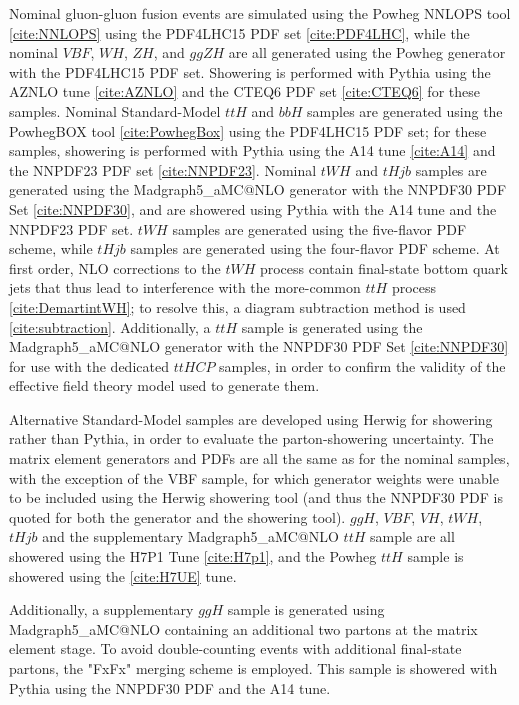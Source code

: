 Nominal gluon-gluon fusion events are simulated using the Powheg NNLOPS tool \ref{cite:NNLOPS} using the PDF4LHC15 PDF set \ref{cite:PDF4LHC}, while the nominal $VBF$, $WH$, $ZH$, and $ggZH$ are all generated using the Powheg generator with the PDF4LHC15 PDF set. Showering is performed with Pythia using the AZNLO tune \ref{cite:AZNLO} and the CTEQ6 PDF set \ref{cite:CTEQ6} for these samples. Nominal Standard-Model $ttH$ and $bbH$ samples are generated using the PowhegBOX tool \ref{cite:PowhegBox} using the PDF4LHC15 PDF set; for these samples, showering is performed with Pythia using the A14 tune \ref{cite:A14} and the NNPDF23 PDF set \ref{cite:NNPDF23}. Nominal $tWH$ and $tHjb$ samples are generated using the Madgraph5_aMC@NLO generator with the NNPDF30 PDF Set \ref{cite:NNPDF30}, and are showered using Pythia with the A14 tune and the NNPDF23 PDF set. $tWH$ samples are generated using the five-flavor PDF scheme, while $tHjb$ samples are generated using the four-flavor PDF scheme. At first order, NLO corrections to the $tWH$ process contain final-state bottom quark jets that thus lead to interference with the more-common $ttH$ process \ref{cite:DemartintWH}; to resolve this, a diagram subtraction method is used \ref{cite:subtraction}.
Additionally, a $ttH$ sample is generated using the Madgraph5_aMC@NLO generator with the NNPDF30 PDF Set \ref{cite:NNPDF30} for use with the dedicated $ttH CP$ samples, in order to confirm the validity of the effective field theory model used to generate them.

Alternative Standard-Model samples are developed using Herwig for showering rather than Pythia, in order to evaluate the parton-showering uncertainty. The matrix element generators and PDFs are all the same as for the nominal samples, with the exception of the VBF sample, for which generator weights were unable to be included using the Herwig showering tool (and thus the NNPDF30 PDF is quoted for both the generator and the showering tool). $ggH$, $VBF$, $VH$, $tWH$, $tHjb$ and the supplementary Madgraph5_aMC@NLO $ttH$ sample are all showered using the H7P1 Tune \ref{cite:H7p1}, and the Powheg $ttH$ sample is showered using the \ref{cite:H7UE} tune.

Additionally, a supplementary $ggH$ sample is generated using Madgraph5_aMC@NLO containing an additional two partons at the matrix element stage. To avoid double-counting events with additional final-state partons, the "FxFx" merging scheme is employed. This sample is showered with Pythia using the NNPDF30 PDF and the A14 tune.
 
